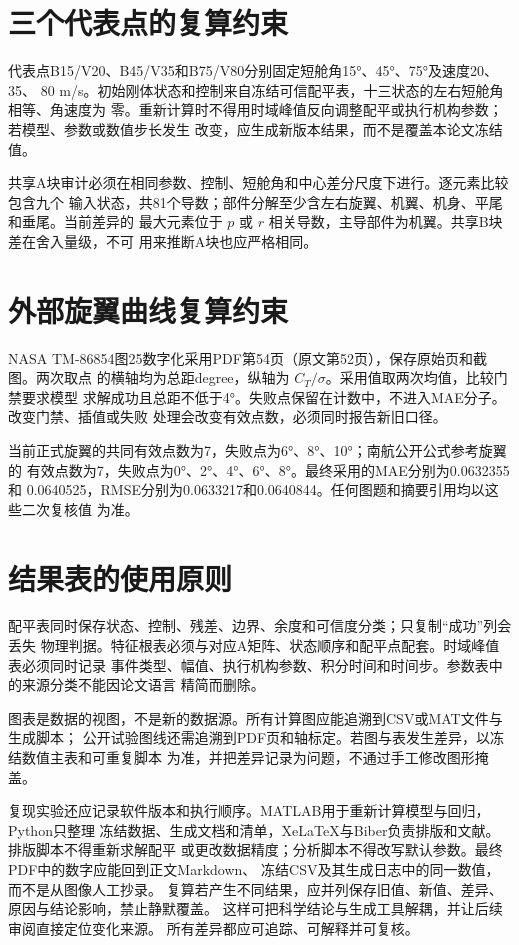 \documentclass[UTF8,12pt,oneside,openany,fontset=windows]{ctexbook}
\begin{document}
\section{三个代表点的复算约束}

代表点B15/V20、B45/V35和B75/V80分别固定短舱角15°、45°、75°及速度20、35、 80 m/s。初始刚体状态和控制来自冻结可信配平表，十三状态的左右短舱角相等、角速度为 零。重新计算时不得用时域峰值反向调整配平或执行机构参数；若模型、参数或数值步长发生 改变，应生成新版本结果，而不是覆盖本论文冻结值。

共享A块审计必须在相同参数、控制、短舱角和中心差分尺度下进行。逐元素比较包含九个 输入状态，共81个导数；部件分解至少含左右旋翼、机翼、机身、平尾和垂尾。当前差异的 最大元素位于 \(p\) 或 \(r\) 相关导数，主导部件为机翼。共享B块差在舍入量级，不可 用来推断A块也应严格相同。

\section{外部旋翼曲线复算约束}

NASA TM-86854图25数字化采用PDF第54页（原文第52页），保存原始页和截图。两次取点 的横轴均为总距degree，纵轴为 \(C_T/\sigma\)。采用值取两次均值，比较门禁要求模型 求解成功且总距不低于4°。失败点保留在计数中，不进入MAE分子。改变门禁、插值或失败 处理会改变有效点数，必须同时报告新旧口径。

当前正式旋翼的共同有效点数为7，失败点为6°、8°、10°；南航公开公式参考旋翼的 有效点数为7，失败点为0°、2°、4°、6°、8°。最终采用的MAE分别为0.0632355和 0.0640525，RMSE分别为0.0633217和0.0640844。任何图题和摘要引用均以这些二次复核值 为准。

\section{结果表的使用原则}

配平表同时保存状态、控制、残差、边界、余度和可信度分类；只复制“成功”列会丢失 物理判据。特征根表必须与对应A矩阵、状态顺序和配平点配套。时域峰值表必须同时记录 事件类型、幅值、执行机构参数、积分时间和时间步。参数表中的来源分类不能因论文语言 精简而删除。

图表是数据的视图，不是新的数据源。所有计算图应能追溯到CSV或MAT文件与生成脚本； 公开试验图线还需追溯到PDF页和轴标定。若图与表发生差异，以冻结数值主表和可重复脚本 为准，并把差异记录为问题，不通过手工修改图形掩盖。

复现实验还应记录软件版本和执行顺序。MATLAB用于重新计算模型与回归，Python只整理 冻结数据、生成文档和清单，XeLaTeX与Biber负责排版和文献。排版脚本不得重新求解配平 或更改数据精度；分析脚本不得改写默认参数。最终PDF中的数字应能回到正文Markdown、 冻结CSV及其生成日志中的同一数值，而不是从图像人工抄录。 复算若产生不同结果，应并列保存旧值、新值、差异、原因与结论影响，禁止静默覆盖。 这样可把科学结论与生成工具解耦，并让后续审阅直接定位变化来源。 所有差异都应可追踪、可解释并可复核。
\end{document}
